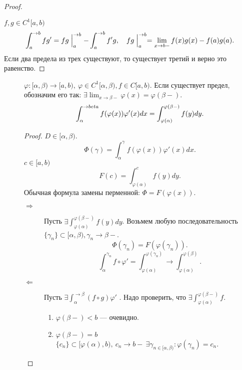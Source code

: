 \begin{prop}
\begin{proof}
\begin{defn}
	\end{defn}
	$ f, g \in  C^{1}[a, b)$
	\[
	    \int_{a}^{ \to b} f g' = fg \Bigm|_a^{ \to  b} - \int_{a}^{ \to b}  f' g, \quad fg \Bigm|_a^{ \to b} = \lim_{x \to b-} f(x) g(x) - f(a)g(a)
	.\]
	Если два предела из трех существуют, то существует третий и верно это равенство.
    \end{proof}
    \begin{description}
\item []
    $ \varphi : [ \alpha , \beta ) \to [a, b) , ~ \varphi  \in C^{1}[ \alpha , \beta ), f \in C[a, b)$. Если существует предел, обозначим его так: $ \exists \lim_{x \to  \beta -}  \varphi (x) = \varphi ( \beta -)$.
    \[
	\int_{ \alpha }^{ \to \\beta } f( \varphi (x)) \varphi '(x) dx = \int_{ \varphi ( \alpha ) }^{ \varphi (\beta -)} f(y) dy
    .\]
    \begin{proof}
	$ D \in [ \alpha , \beta )$. \[
	    \Phi (\gamma) = \int_{ \alpha}^{\gamma}  f( \varphi (x)) \varphi '(x) dx
	.\]
	$ c \in  [a, b)$
	\[
	    F(c) =\int_{ \varphi (\alpha)}^{c } f(y) dy
	.\]
	Обычная формула замены перменной: $ \Phi = F( \varphi (x))$.
	\begin{description}
	    \item [$\boxed{ \Longrightarrow }$]  Пусть $ \exists  \int_{ \varphi ( \alpha )}^{ \varphi (\beta-)}  f(y) dy$. Возьмем любую последовательность $ \{ \gamma_n \} \subset [ \alpha , \beta ),  \gamma _n \to  \beta  -$.
		\[
		    \Phi(\gamma_n) = F( \varphi (\gamma_n))
		.\]
		\[
		    \int_{ \alpha }^{ \gamma_n} f \circ \varphi ' = \int_{ \varphi ( \alpha )}^{ \varphi (\gamma_n)} \to \int_{\varphi(\alpha)}^{\varphi(\beta)}
		.\]
	    \item [$\boxed{ \Longleftarrow }$]  Пусть $ \exists \int_{\alpha}^{ \to \beta }(f \circ g) \varphi '  $
		. Надо проверить, что $ \exists  \int_{ \varphi ( \alpha )}^{ \varphi (\beta -)} f $.
		\begin{enumerate}
		    \item $ \varphi (\beta-) < b$ --- очевидно.
		    \item $ \varphi (\beta -) = b$
			$ \{ c_n \} \subset [ \varphi ( \alpha ), b) ,  ~ c_n \to  b- ~ \exists \gamma_{n \in[ \alpha , \beta )}: \varphi ( \gamma_n) = c_n$.


\end{enumerate}
\end{description}
\end{proof}
\end{description}
\end{prop}
